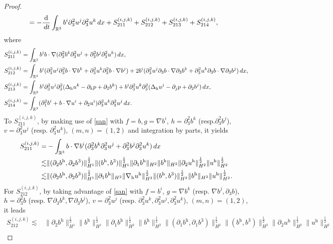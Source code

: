 \documentclass[10pt,a4paper]{amsart}
\newcommand{\R}{\mathbb{R}}
\newcommand{\dt}{\,{\rm d}t}
\newcommand{\dx}{\,{\rm d}x}
\newcommand{\h}{\mathrm{h}}
\newcommand{\nablah}{\nabla_{\mathrm{h}}}
\begin{document}
\begin{proof}
\begin{align}
		& =-\frac{\mathrm{d}}{\dt}\int_{\R^3}b^i\partial_3^2u^j\partial_3^2u^k\dx+S^{(i,j,k)}_{211}+S^{(i,j,k)}_{212}+S^{(i,j,k)}_{213}+S^{(i,j,k)}_{214},
	\end{align}
	where
	\begin{align*}
		S^{(i,j,k)}_{211}&=\int_{\R^3} b^ib\cdot\nabla (\partial_3^2b^k\partial_3^2u^j+\partial_3^2b^j\partial_3^2u^k)\dx,\\
		S^{(i,j,k)}_{212}&=\int_{\R^3}b^i(\partial_3^2u^j\partial_3^2b\cdot\nabla b^k+\partial_3^2u^k\partial_3^2b\cdot\nabla b^j)+2b^i(\partial_3^2u^j\partial_3b\cdot\nabla \partial_3b^k+\partial_3^2u^k\partial_3b\cdot\nabla \partial_3b^j)\dx,\\
		S^{(i,j,k)}_{213}&=\int_{\R^3}b^i\partial_3^2u^j\partial_3^2(\Delta_\h u^k-\partial_kp+\partial_2b^k)+b^i\partial_3^2u^k\partial_3^2(\Delta_\h u^j-\partial_jp+\partial_2b^j)\dx,\\
		S^{(i,j,k)}_{214}&=\int_{\R^3}(\partial_1^2b^i+b\cdot\nabla u^i+\partial_2u^i)\partial_3^2u^k\partial_3^2u^j\dx.
	\end{align*}
	To $S^{(i,j,k)}_{211}$, by making use of \eqref{san} with $f=b,g=\nabla b^i$, $h=\partial_3^2b^k$ (resp.$\partial_3^2b^j$), $v=\partial_3^2u^j$ (resp. $\partial_3^2u^k$), $(m,n)=(1,2)$ and integration by parts, it yields
	\begin{align}\label{S211}
		S^{(i,j,k)}_{211}=&-\int_{\R^3} b\cdot\nabla b^i (\partial_3^2b^k\partial_3^2u^j+\partial_3^2b^j\partial_3^2u^k)\dx\nonumber\\
		\lesssim&\|(\partial_2b^\h,\partial_2b^3)\|_{H^1}^\frac12\|(b^\h,b^3)\|_{H^1}^\frac12\|\partial_1b^\h\|_{H^2}\|b^\h\|_{H^2}\|\partial_2u^\h\|_{H^2}^\frac12\|u^\h\|_{H^2}^\frac12\nonumber\\
		\lesssim&\|(\partial_2b^\h,\partial_2b^3)\|_{H^1}^\frac12\|\partial_1b^\h\|_{H^2}\|\nablah u^\h\|_{H^2}^\frac12\|(b^\h,b^3)\|_{H^2}^\frac12\|b^\h\|_{H^2}\|u^\h\|_{H^2}^\frac12.
	\end{align}
	For $S^{(i,j,k)}_{212}$, by taking advantage of \eqref{san} with $f=b^i$, $g=\nabla b^k$ (resp. $\nabla b^j,\partial_3b$), $h=\partial_3^2b$ (resp. $\nabla \partial_3b^k,\nabla \partial_3b^j$), $v=\partial_3^2u^j$ (resp. $\partial_3^2u^k,\partial_3^2u^j,\partial_3^2u^k$), $(m,n)=(1,2)$, it leads
	\begin{align}\label{S212}
		S^{(i,j,k)}_{212}	\lesssim&\|\partial_2b^\h\|_{H^1}^\frac12\|b^\h\|_{H^1}^\frac12\|\partial_1b^\h\|_{H^2}^\frac12\|b^\h\|_{H^2}^\frac12\|(\partial_1b^\h,\partial_1b^3)\|_{H^2}^\frac12\|(b^\h,b^3)\|_{H^2}^\frac12\|\partial_2u^\h\|_{H^2}^\frac12\|u^\h\|_{H^2}^\frac12\nonumber\\

\end{align}
\end{proof}
\end{document}
